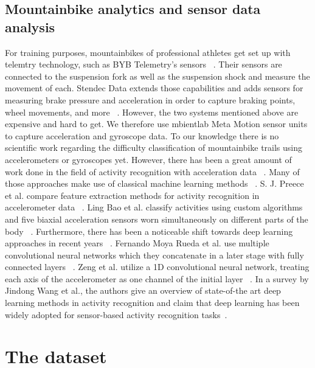 \documentclass[runningheads]{llncs}
\begin{document}
\subsection{Mountainbike analytics and sensor data analysis}
For training purposes, mountainbikes of professional athletes get set up with telemtry technology, such as BYB Telemetry's sensors ~\cite{bybtelemetry}.
Their sensors are connected to the suspension fork as well as the suspension shock and measure the movement of each.
Stendec Data extends those capabilities and adds sensors for measuring brake pressure and acceleration in order to capture braking points, wheel movements, and more ~\cite{stendecracing}.
However, the two systems mentioned above are expensive and hard to get.
We therefore use mbientlab Meta Motion sensor units to capture acceleration and gyroscope data.
To our knowledge there is no scientific work regarding the difficulty classification of mountainbike trails using accelerometers or gyroscopes yet.
However, there has been a great amount of work done in the field of activity recognition with acceleration data ~\cite{ravi2005activity,bao2004activity,kwapisz2011activity,lara2012survey,yang2015deep,zeng2014convolutional,ronao2016human}.
Many of those approaches make use of classical machine learning methods ~\cite{ravi2005activity,bao2004activity,kwapisz2011activity,lara2012survey,preece2008comparison}.
S. J. Preece et al. compare feature extraction methods for activity recognition in accelerometer data ~\cite{preece2008comparison}.
Ling Bao et al. classify activities using custom algorithms and five  biaxial acceleration sensors worn simultaneously on different parts of the body ~\cite{bao2004activity}.
Furthermore, there has been a noticeable shift towards deep learning approaches in recent years ~\cite{yang2015deep,zeng2014convolutional,ronao2016human}.
Fernando Moya Rueda et al. use multiple convolutional neural networks which they concatenate in a later stage with fully connected layers ~\cite{moya2018convolutional}.
Zeng et al. utilize a 1D convolutional neural network, treating each axis of the accelerometer as one channel of the initial layer ~\cite{zeng2014convolutional}.
In a survey by Jindong Wang et al., the authors give an overview of state-of-the art deep learning methods in activity recognition and claim that deep learning has been widely adopted for sensor-based activity recognition tasks~\cite{wang2019deep}.


\section{The dataset}
\end{document}

